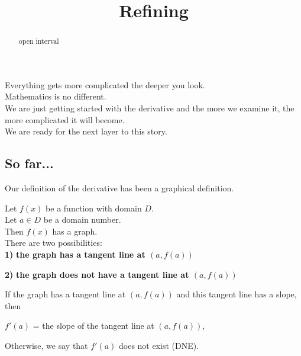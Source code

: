 \documentclass{ximera}
\title{Refining}
\begin{document}
\begin{abstract}
open interval
\end{abstract}
\maketitle



Everything gets more complicated the deeper you look. \\


Mathematics is no different. \\


We are just getting started with the derivative and the more we examine it, the more complicated it will become. \\

We are ready for the next layer to this story. \\




\subsection*{So far...}


Our definition of the derivative has been a graphical definition.

\begin{idea}

Let $f(x)$ be a function with domain $D$. \\
Let $a \in D$ be a domain number. \\

Then $f(x)$ has a graph. \\

There are two possibilities:  \\


\textbf{\textcolor{blue!55!black}{1)}} \textbf{the graph has a tangent line at $(a, f(a))$}

\textbf{\textcolor{blue!55!black}{2)}} \textbf{the graph does not have a tangent line at $(a, f(a))$}




If the graph has a tangent line at $(a, f(a))$ and this tangent line has a slope, then


\begin{center}

$f'(a)$ = the slope of the tangent line at $(a, f(a))$,

\end{center}



Otherwise, we say that $f'(a)$ does not exist (DNE).






\end{idea}
\end{document}
